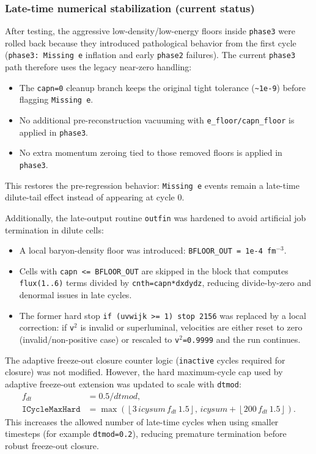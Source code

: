 \documentclass[11pt,a4paper]{article}
\begin{document}
\subsubsection{Late-time numerical stabilization (current status)}
After testing, the aggressive low-density/low-energy floors inside
\texttt{phase3} were rolled back because they introduced pathological behavior
from the first cycle (\texttt{phase3: Missing e} inflation and early
\texttt{phase2} failures). The current \texttt{phase3} path therefore uses the
legacy near-zero handling:
\begin{itemize}
\item The \texttt{capn=0} cleanup branch keeps the original tight tolerance
      (\texttt{\textasciitilde 1e-9}) before flagging \texttt{Missing e}.
\item No additional pre-reconstruction vacuuming with
      \texttt{e\_floor/capn\_floor} is applied in \texttt{phase3}.
\item No extra momentum zeroing tied to those removed floors is applied in
      \texttt{phase3}.
\end{itemize}
This restores the pre-regression behavior: \texttt{Missing e} events remain a
late-time dilute-tail effect instead of appearing at cycle 0.

Additionally, the late-output routine \texttt{outfin} was hardened to avoid
artificial job termination in dilute cells:
\begin{itemize}
\item A local baryon-density floor was introduced:
      \texttt{BFLOOR\_OUT = 1e-4 fm$^{-3}$}.
\item Cells with \texttt{capn <= BFLOOR\_OUT} are skipped in the block that
      computes \texttt{flux(1..6)} terms divided by \texttt{cnth=capn*dxdydz},
      reducing divide-by-zero and denormal issues in late cycles.
\item The former hard stop
      \texttt{if (uvwijk >= 1) stop 2156} was replaced by a local correction:
      if \texttt{v$^2$} is invalid or superluminal, velocities are either reset
      to zero (invalid/non-positive case) or rescaled to \texttt{v$^2$=0.9999}
      and the run continues.
\end{itemize}

The adaptive freeze-out closure counter logic (\texttt{inactive} cycles required
for closure) was not modified. However, the hard maximum-cycle cap used by
adaptive freeze-out extension was updated to scale with \texttt{dtmod}:
\begin{align*}
f_{dt} &= 0.5/dtmod,\\
\texttt{ICycleMaxHard} &= \max\left(
\left\lfloor 3\,icysum\,f_{dt}\,1.5 \right\rfloor,\,
icysum + \left\lfloor 200\,f_{dt}\,1.5 \right\rfloor
\right).
\end{align*}
This increases the allowed number of late-time cycles when using smaller
timesteps (for example \texttt{dtmod=0.2}), reducing premature termination
before robust freeze-out closure.
\end{document}
